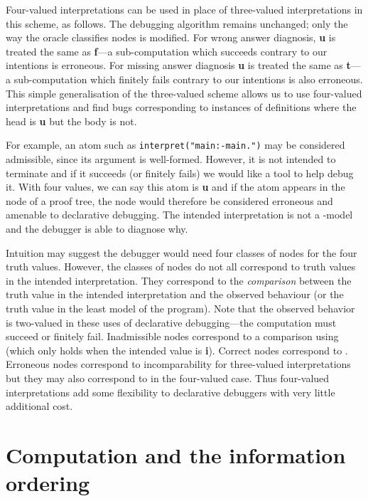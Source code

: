 \documentclass{tlp}
\begin{document}
Four-valued interpretations can be used in place of three-valued
interpretations in this scheme, as follows.  The debugging algorithm remains
unchanged; only the way the oracle classifies nodes is modified.
For wrong answer diagnosis, \textbf{u} is treated the same
as \textbf{f}---a sub-computation which succeeds contrary to our
intentions is erroneous.  For missing answer diagnosis \textbf{u} is
treated the same as \textbf{t}---a sub-computation which finitely
fails contrary to our intentions is also erroneous.  This simple
generalisation of the three-valued scheme allows us to use four-valued
interpretations and
find bugs corresponding to instances of definitions where the head is
\textbf{u} but the body is not.

For example, an atom such as \texttt{interpret("main:-main.")} may be
considered admissible, since its argument is well-formed.  However,
it is not intended to terminate and if it succeeds (or finitely fails)
we would like a tool to help debug it.  With four values, we can say
this atom is \textbf{u} and if the atom appears in the node of a proof
tree, the node would therefore be considered erroneous and amenable to
declarative debugging.  The intended interpretation is not a
-model and the debugger is able to diagnose why.

Intuition may suggest the debugger would need four classes of
nodes for the four truth values.  However, the classes of nodes do
not all correspond to truth values in the intended interpretation.
They correspond to the \emph{comparison} between the truth value in the
intended interpretation and the observed behaviour (or the truth value
in the least model of the program).  Note that the observed behavior is
two-valued in these uses of declarative debugging---the computation must
succeed or finitely fail.  Inadmissible nodes correspond to a
comparison using 
(which only holds when the intended value is \textbf{i}).  Correct nodes
correspond to .  Erroneous nodes correspond to incomparability for
three-valued interpretations but they may also correspond to 
in the four-valued case.  Thus four-valued interpretations add some
flexibility to declarative debuggers with very little additional cost.



\section{Computation and the information ordering}
\label{sec-computation-information}
\end{document}
